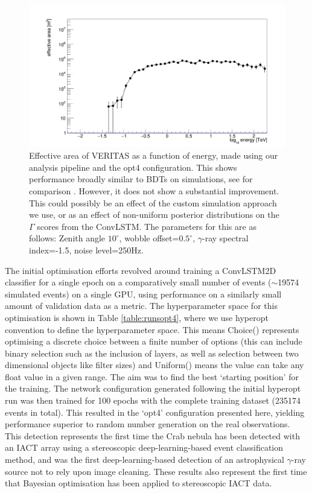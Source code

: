 \begin{figure}[] 
        \centering \includegraphics[width=\columnwidth]{figures/EFF.png}

        \caption{
                \label{fig:EFF} Effective area of VERITAS as a function of energy, made using our analysis pipeline and the opt4 configuration. This shows performance broadly similar to BDTs on simulations, see for comparison \cite{vereff}. However, it does not show a substantial improvement. This could possibly be an effect of the custom simulation approach we use, or as an effect of non-uniform posterior distributions on the $\Gamma$ scores from the ConvLSTM. The parameters for this are as follows: Zenith angle $10^{\circ}$, wobble offset=$0.5^{\circ}$, $\gamma$-ray spectral index=-1.5, noise level=250Hz. 
        }
\end{figure}
The initial optimisation efforts revolved around training a ConvLSTM2D classifier for a single epoch on a comparatively small number of events ($\sim$19574 simulated events) on a single GPU, using performance on a similarly small amount of validation data as a metric. The hyperparameter space for this optimisation is shown in Table \ref{table:runsopt4}, where we use hyperopt convention to define the hyperparameter space. This means Choice() represents optimising a discrete choice between a finite number of options (this can include binary selection such as the inclusion of layers, as well as selection between two dimensional objects like filter sizes) and Uniform() means the value can take any float value in a given range. The aim was to find the best `starting position' for the training. The network configuration generated following the initial hyperopt run was then trained for 100 epochs with the complete training dataset (235174 events in total). This resulted in the `opt4' configuration presented here, yielding performance superior to random number generation on the real observations. This detection represents the first time the Crab nebula has been detected with an IACT array using a stereoscopic deep-learning-based event classification method, and was the first deep-learning-based detection of an astrophysical $\gamma$-ray source not to rely upon image cleaning. These results also represent the first time that Bayesian optimisation has been applied to stereoscopic IACT data.


